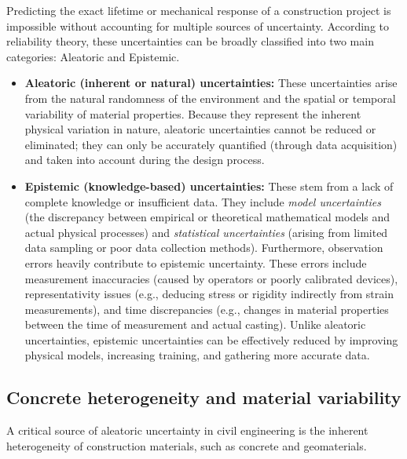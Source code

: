 \documentclass[a4paper,12pt,twoside]{report}     %
\begin{document}
Predicting the exact lifetime or mechanical response of a construction project is impossible without accounting for multiple sources of uncertainty. According to reliability theory, these uncertainties can be broadly classified into two main categories: Aleatoric and Epistemic.
\begin{itemize}
    \item \textbf{Aleatoric (inherent or natural) uncertainties:} These uncertainties arise from the natural randomness of the environment and the spatial or temporal variability of material properties. Because they represent the inherent physical variation in nature, aleatoric uncertainties cannot be reduced or eliminated; they can only be accurately quantified (through data acquisition) and taken into account during the design process.
    
    \item \textbf{Epistemic (knowledge-based) uncertainties:} These stem from a lack of complete knowledge or insufficient data. They include \textit{model uncertainties} (the discrepancy between empirical or theoretical mathematical models and actual physical processes) and \textit{statistical uncertainties} (arising from limited data sampling or poor data collection methods). Furthermore, observation errors heavily contribute to epistemic uncertainty. These errors include measurement inaccuracies (caused by operators or poorly calibrated devices), representativity issues (e.g., deducing stress or rigidity indirectly from strain measurements), and time discrepancies (e.g., changes in material properties between the time of measurement and actual casting). Unlike aleatoric uncertainties, epistemic uncertainties can be effectively reduced by improving physical models, increasing training, and gathering more accurate data.
\end{itemize}

\subsection{Concrete heterogeneity and material variability}

A critical source of aleatoric uncertainty in civil engineering is the inherent heterogeneity of construction materials, such as concrete and geomaterials. 
\end{document}
